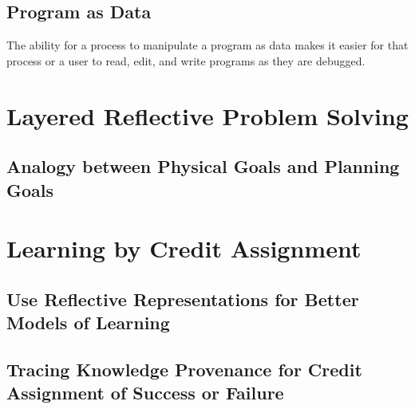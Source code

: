 \subsection{Program as Data}

The ability for a process to manipulate a program as data makes it
easier for that process or a user to read, edit, and write programs as
they are debugged.


\section{Layered Reflective Problem Solving}

\subsection{Analogy between Physical Goals and Planning Goals}


\section{Learning by Credit Assignment}

\subsection{Use Reflective Representations for Better Models of Learning}

\subsection{Tracing Knowledge Provenance for Credit Assignment of Success or Failure}



